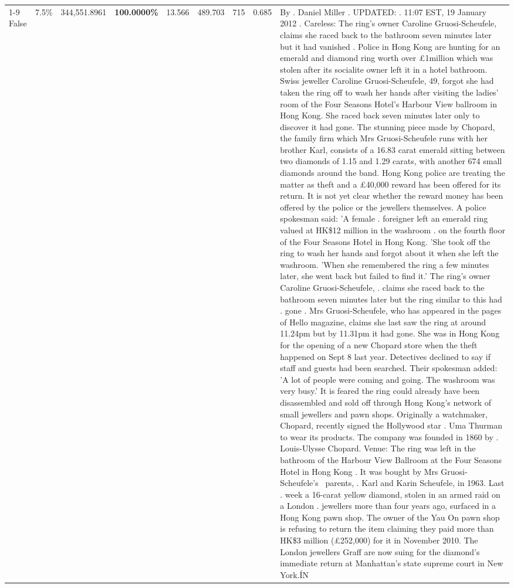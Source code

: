 \begin{table}[H]
\begin{tabular}{lllrlllll}
\cline{1-9}
False & 7.5\% & 344,551.8961 & \bfseries \color{red} 100.0000\% & 13.566 & 489.703 & 715 & 0.685 & By . Daniel Miller . UPDATED: . 11:07 EST, 19 January 2012 . Careless: The ring's owner Caroline Gruosi-Scheufele, claims she raced back to the bathroom seven minutes later but it had vanished . Police in Hong Kong are hunting for an emerald and diamond ring worth over £1million which was stolen after its socialite owner left it in a hotel bathroom. Swiss jeweller Caroline Gruosi-Scheufele, 49, forgot she had taken the ring off to wash her hands after visiting the ladies' room of the Four Seasons Hotel's Harbour View ballroom in Hong Kong. She raced back seven minutes later only to discover it had gone. The stunning piece made by Chopard, the family firm which Mrs Gruosi-Scheufele runs with her brother Karl, consists of a 16.83 carat emerald sitting between two diamonds of 1.15 and 1.29 carats, with another 674 small diamonds around the band. Hong Kong police are treating the matter as theft and a £40,000 reward has been offered for its return. It is not yet clear whether the reward money has been offered by the police or the jewellers themselves. A police spokesman said: 'A female . foreigner left an emerald ring valued at HK\$12 million in the washroom . on the fourth floor of the Four Seasons Hotel in Hong Kong. 'She took off the ring to wash her hands and forgot about it when she left the washroom. 'When she remembered the ring a few minutes later, she went back but failed to find it.' The ring's owner Caroline Gruosi-Scheufele, . claims she raced back to the bathroom seven minutes later but the ring similar to this had . gone . Mrs Gruosi-Scheufele, who has appeared in the pages of Hello magazine, claims she last saw the ring at around 11.24pm but by 11.31pm it had gone. She was in Hong Kong for the opening of a new Chopard store when the theft happened on Sept 8 last year. Detectives declined to say if staff and guests had been searched. Their spokesman added: 'A lot of people were coming and going. The washroom was very busy.' It is feared the ring could already have been disassembled and sold off through Hong Kong's network of small jewellers and pawn shops. Originally a watchmaker, Chopard, recently signed the Hollywood star . Uma Thurman to wear its products. The company was founded in 1860 by . Louis-Ulysse Chopard. Venue: The ring was left in the bathroom of the Harbour View Ballroom at the Four Seasons Hotel in Hong Kong . It was bought by Mrs Gruosi-Scheufele's  parents, . Karl and Karin Scheufele, in 1963. Last . week a 16-carat yellow diamond, stolen in an armed raid on a London . jewellers more than four years ago, surfaced in a Hong Kong pawn shop. The owner of the Yau On pawn shop is refusing to return the item claiming they paid more than HK\$3 million (£252,000) for it in November 2010. The London jewellers Graff are now suing for the diamond’s immediate return at Manhattan’s state supreme court in New York.ÍN \\

\end{tabular}
\end{table}
